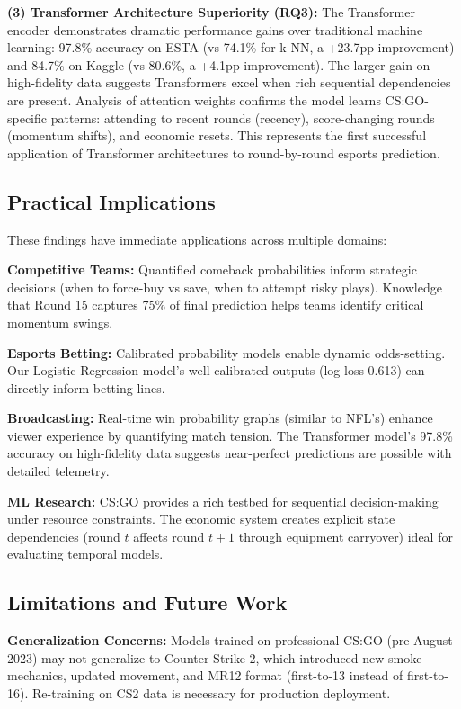 \documentclass[10pt,twocolumn]{article}
\begin{document}
\textbf{(3) Transformer Architecture Superiority (RQ3):} The Transformer encoder demonstrates dramatic performance gains over traditional machine learning: 97.8\% accuracy on ESTA (vs 74.1\% for k-NN, a +23.7pp improvement) and 84.7\% on Kaggle (vs 80.6\%, a +4.1pp improvement). The larger gain on high-fidelity data suggests Transformers excel when rich sequential dependencies are present. Analysis of attention weights confirms the model learns CS:GO-specific patterns: attending to recent rounds (recency), score-changing rounds (momentum shifts), and economic resets. This represents the first successful application of Transformer architectures to round-by-round esports prediction.



\subsection{Practical Implications}

These findings have immediate applications across multiple domains:

\textbf{Competitive Teams:} Quantified comeback probabilities inform strategic decisions (when to force-buy vs save, when to attempt risky plays). Knowledge that Round 15 captures 75\% of final prediction helps teams identify critical momentum swings.

\textbf{Esports Betting:} Calibrated probability models enable dynamic odds-setting. Our Logistic Regression model's well-calibrated outputs (log-loss 0.613) can directly inform betting lines.

\textbf{Broadcasting:} Real-time win probability graphs (similar to NFL's) enhance viewer experience by quantifying match tension. The Transformer model's 97.8\% accuracy on high-fidelity data suggests near-perfect predictions are possible with detailed telemetry.

\textbf{ML Research:} CS:GO provides a rich testbed for sequential decision-making under resource constraints. The economic system creates explicit state dependencies (round $t$ affects round $t+1$ through equipment carryover) ideal for evaluating temporal models.

\subsection{Limitations and Future Work}

\textbf{Generalization Concerns:} Models trained on professional CS:GO (pre-August 2023) may not generalize to Counter-Strike 2, which introduced new smoke mechanics, updated movement, and MR12 format (first-to-13 instead of first-to-16). Re-training on CS2 data is necessary for production deployment.
\end{document}
